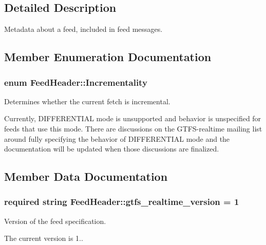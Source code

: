 \subsection{Detailed Description}
Metadata about a feed, included in feed messages. 

\subsection{Member Enumeration Documentation}
\subsubsection[{\texorpdfstring{Incrementality}{Incrementality}}]{\setlength{\rightskip}{0pt plus 5cm}enum {\bf Feed\+Header\+::\+Incrementality}}\hypertarget{structFeedHeader_a014e597904baf6375bc0b83aeb31b825}{}\label{structFeedHeader_a014e597904baf6375bc0b83aeb31b825}


Determines whether the current fetch is incremental. 

Currently, D\+I\+F\+F\+E\+R\+E\+N\+T\+I\+AL mode is unsupported and behavior is unspecified for feeds that use this mode. There are discussions on the G\+T\+F\+S-\/realtime mailing list around fully specifying the behavior of D\+I\+F\+F\+E\+R\+E\+N\+T\+I\+AL mode and the documentation will be updated when those discussions are finalized. 

\subsection{Member Data Documentation}
\subsubsection[{\texorpdfstring{gtfs\+\_\+realtime\+\_\+version}{gtfs_realtime_version}}]{\setlength{\rightskip}{0pt plus 5cm}required string Feed\+Header\+::gtfs\+\_\+realtime\+\_\+version = 1}\hypertarget{structFeedHeader_ab5e670b9182621dd8990b827ee028ee0}{}\label{structFeedHeader_ab5e670b9182621dd8990b827ee028ee0}


Version of the feed specification. 

The current version is 1.. 
